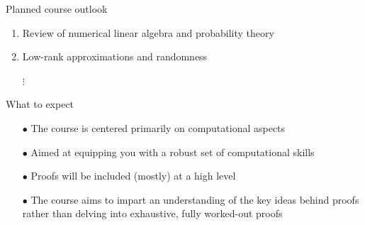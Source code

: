 \documentclass{beamer}
\begin{document}
\begin{frame}{Planned course outlook}

\begin{enumerate}
    \item Review of numerical linear algebra and probability theory
    \item Low-rank approximations and randomness
    \item[$\vdots$]
\end{enumerate}

\end{frame}

\begin{frame}{What to expect}

\begin{itemize}
    \item[$\bullet$] The course is centered primarily on computational aspects
    \item[$\bullet$] Aimed at equipping you with a robust set of computational skills
    \item[$\bullet$] Proofs will be included (mostly) at a high level
    \item[$\bullet$] The course aims to impart an understanding of the key ideas behind proofs rather than delving into exhaustive, fully worked-out proofs
\end{itemize}

\end{frame}
\end{document}
